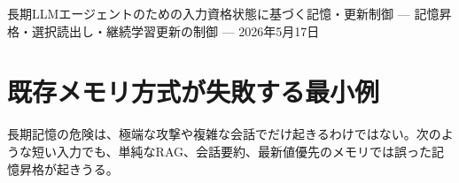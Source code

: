 \documentclass[12pt,a4paper]{article}
\begin{document}
\PaperTitleBlock
  {長期LLMエージェントのための入力資格状態に基づく記憶・更新制御}
  {— 記憶昇格・選択読出し・継続学習更新の制御 —}
  {2026年5月17日}

\begin{abstract}
長期的に利用されるLLMエージェントでは、単に会話履歴を長く保持するだけでは、記憶の有用性と安全性は両立しない。ユーザー入力には、本人由来の前提、仮説、冗談、引用、貼り付け文、相槌、部分同意、訂正、削除要求、記憶禁止、第三者情報、秘密情報、一時的な指示、長期方針が混在する。これらをすべて同じ「文脈情報」または「ユーザー事実」として扱うと、長期記憶には未確認前提が混入し、継続学習では古い前提や削除済み情報が更新材料に混入し、エージェントの行動判断も不安定になる。

本稿は、長期LLMエージェントにおける記憶を、事実を蓄積する装置ではなく、入力情報の資格状態、記憶状態、使用権限、安定度を保持する制御系として捉える。入力は直ちに現在利用可能前提へ昇格されるのではなく、候補、仮説、引用、貼り付け素材、弱い相槌、過去情報、削除済み、記憶禁止、レビュー要求などの状態を経由する。さらに、記憶読出し、継続学習更新、行動候補実行の各段階で、これらの状態を参照する。

この枠組みにより、長期記憶、継続学習、自己更新候補、行動実行を、単一の大きなプロンプトや単純なRAGではなく、状態つき台帳とゲートの連鎖として扱える。本稿は、現時点で確認された設計原理、評価設計、失敗モード、主張範囲を整理する。なお、本稿はAGI達成、無限記憶、任意自然会話での完全成功を主張しない。

本稿は、長期記憶を増やす方法ではなく、入力情報を後で安全に使うための資格状態制御として整理する。
\end{abstract}

\section{既存メモリ方式が失敗する最小例}\label{ux65e2ux5b58ux30e1ux30e2ux30eaux65b9ux5f0fux304cux5931ux6557ux3059ux308bux6700ux5c0fux4f8b}

長期記憶の危険は、極端な攻撃や複雑な会話でだけ起きるわけではない。次のような短い入力でも、単純なRAG、会話要約、最新値優先のメモリでは誤った記憶昇格が起きうる。

\begin{center}
\end{center}
\end{document}
